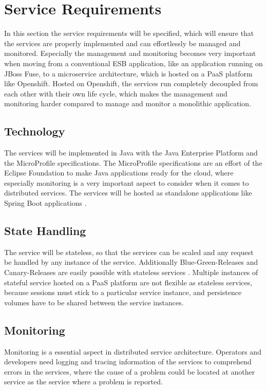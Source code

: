 \section{Service Requirements}
\label{sec:esboc-requirements-service}
In this section the service requirements will be specified, which will ensure that the services are properly implemented and can effortlessly be managed and monitored. Especially the management and monitoring becomes very important when moving from a conventional ESB application, like an application running on JBoss Fuse, to a microservice architecture, which is hosted on a PaaS platform like Openshift. Hosted on Openshift, the services run completely decoupled from each other with their own life cycle, which makes the management and monitoring harder compared to manage and monitor a monolithic application.

\subsection{Technology}
\label{sec:esboc-requirements-service-technology}
The services will be implemented in Java with the Java Enterprise Platform and the MicroProfile specifications. The MicroProfile specifications are an effort of the Eclipse Foundation to make Java applications ready for the cloud, where especially monitoring is a very important aspect to consider when it comes to distributed services. The services will be hosted as standalone applications like Spring Boot applications \cite{EclipseMicroprofileCharter2017, EclipseEE4JCharter2017}.

\subsection{State Handling}
\label{sec:esboc-requirements-service-state}
The service will be stateless, so that the services can be scaled and any request be handled by any instance of the service. Additionally Blue-Green-Releases and Canary-Releases are easily possible with stateless services \cite{FowlerBlueGreenRelease2010, FowlerCanaryRelease2010}. Multiple instances of stateful service hosted on a PaaS platform are not flexible as stateless services, because sessions must stick to a particular service instance, and persistence volumes have to be shared between the service instances.  

\subsection{Monitoring}
\label{sec:esboc-requirements-service-monitoring}
Monitoring is a essential aspect in distributed service architecture. Operators and developers need logging and tracing information of the services to comprehend errors in the services, where the cause of a problem could be located at another service as the service where a problem is reported.

